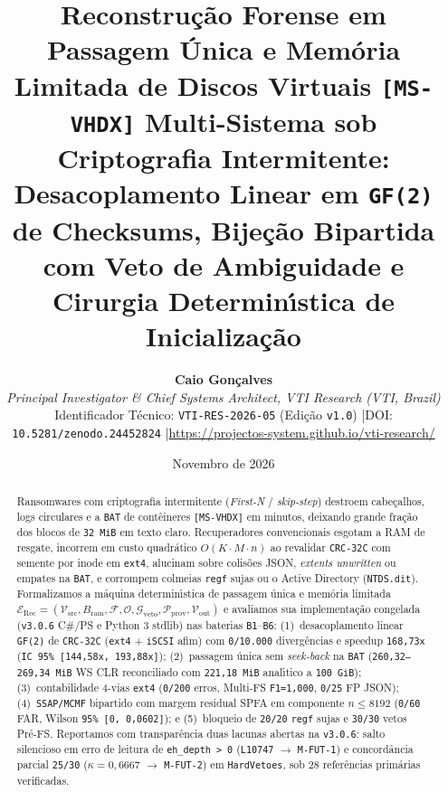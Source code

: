\documentclass[10pt,twocolumn]{article}
\title{\Large\bfseries Reconstru\c{c}\~{a}o Forense em Passagem \'{U}nica e Mem\'{o}ria Limitada de Discos Virtuais \texttt{[MS-VHDX]} Multi-Sistema sob Criptografia Intermitente:\\[0.25em]
\large Desacoplamento Linear em \texttt{GF(2)} de Checksums, Bije\c{c}\~{a}o Bipartida com Veto de Ambiguidade e Cirurgia Determin\'{\i}stica de Inicializa\c{c}\~{a}o}
\author{%
  \textbf{Caio Gon\c{c}alves}\\
  \textit{Principal Investigator \& Chief Systems Architect, VTI Research (VTI, Brazil)}\\
  \small Identificador T\'{e}cnico: \texttt{VTI-RES-2026-05} (Edi\c{c}\~{a}o \texttt{v1.0}) \quad|\quad DOI: \texttt{10.5281/zenodo.24452824} \quad|\quad \url{https://projectos-system.github.io/vti-research/}
}
\date{Novembro de 2026}
\begin{document}
\nocite{R01,R02,R03,R04,R05,R06,R07,R08,R09,R10,R11,R12,R13,R14,R15,R16,R17,R18,R19,R20,R21,R22,R23,R24,R25,R26,R27,R28}

\maketitle

\begin{abstract}
\noindent Ransomwares com criptografia intermitente (\emph{First-N} / \emph{skip-step}) destroem cabe\c{c}alhos, logs circulares e a \texttt{BAT} de cont\^{e}ineres \texttt{[MS-VHDX]} em minutos, deixando grande fra\c{c}\~{a}o dos blocos de \texttt{32 MiB} em texto claro. Recuperadores convencionais esgotam a RAM de resgate, incorrem em custo quadr\'{a}tico $O(K \cdot M \cdot n)$ ao revalidar \texttt{CRC-32C} com semente por inode em \texttt{ext4}, alucinam sobre colis\~{o}es JSON, \emph{extents unwritten} ou empates na \texttt{BAT}, e corrompem colmeias \texttt{regf} sujas ou o Active Directory (\texttt{NTDS.dit}). Formalizamos a m\'{a}quina determin\'{\i}stica de passagem \'{u}nica e mem\'{o}ria limitada $\mathcal{E}_{\mathrm{Rec}} = (\mathcal{V}_{\mathrm{src}}, B_{\mathrm{ram}}, \mathcal{F}, \mathcal{O}, \mathcal{G}_{\mathrm{veto}}, \mathcal{P}_{\mathrm{prov}}, \mathcal{V}_{\mathrm{out}})$ e avaliamos sua implementa\c{c}\~{a}o congelada (\texttt{v3.0.6} C\#/PS e Python 3 stdlib) nas baterias \texttt{B1}--\texttt{B6}: (1)~desacoplamento linear \texttt{GF(2)} de \texttt{CRC-32C} (\texttt{ext4} + \texttt{iSCSI} afim) com \texttt{0/10.000} diverg\^{e}ncias e speedup \texttt{168,73x} (\texttt{IC 95\% [144,58x, 193,88x]}); (2)~passagem \'{u}nica sem \emph{seek-back} na \texttt{BAT} (\texttt{260,32--269,34 MiB} WS CLR reconciliado com \texttt{221,18 MiB} anal\'{\i}tico a \texttt{100 GiB}); (3)~contabilidade 4-vias \texttt{ext4} (\texttt{0/200} erros, Multi-FS \texttt{F1=1,000}, \texttt{0/25} FP JSON); (4)~\texttt{SSAP/MCMF} bipartido com margem residual SPFA em componente $n \le 8192$ (\texttt{0/60} FAR, Wilson \texttt{95\% [0, 0,0602]}); e (5)~bloqueio de \texttt{20/20} \texttt{regf} sujas e \texttt{30/30} vetos Pr\'{e}-FS. Reportamos com transpar\^{e}ncia duas lacunas abertas na \texttt{v3.0.6}: salto silencioso em erro de leitura de \texttt{eh\_depth > 0} (\texttt{L10747} $\to$ \texttt{M-FUT-1}) e concord\^{a}ncia parcial \texttt{25/30} ($\kappa=0,6667$ $\to$ \texttt{M-FUT-2}) em \texttt{HardVetoes}, sob 28 refer\^{e}ncias prim\'{a}rias verificadas.
\end{abstract}
\end{document}
